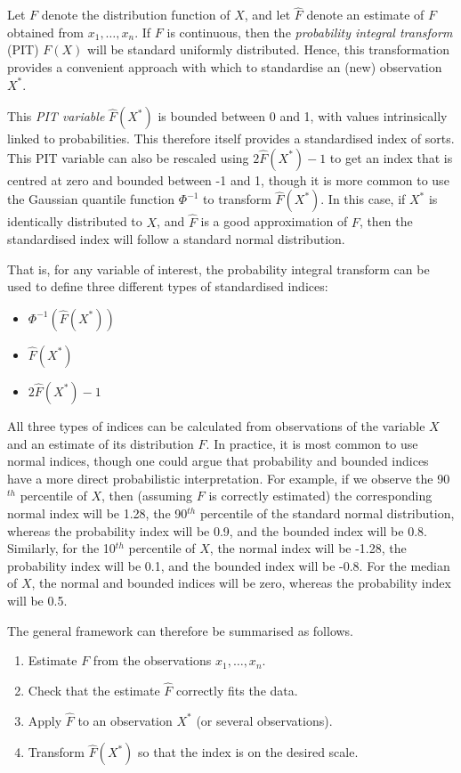 \documentclass[article,shortnames,nojss]{jss}\usepackage[]{graphicx}\usepackage[]{xcolor}
\begin{document}
Let $F$ denote the distribution function of $X$, and let $\hat{F}$ denote an estimate of $F$ obtained from $x_{1}, \dots, x_{n}$. If $F$ is continuous, then the \emph{probability integral transform} (PIT) $F(X)$ will be standard uniformly distributed. Hence, this transformation provides a convenient approach with which to standardise an (new) observation $X^{*}$.

This \emph{PIT variable} $\hat{F}(X^{*})$ is bounded between 0 and 1, with values intrinsically linked to probabilities. This therefore itself provides a standardised index of sorts. This PIT variable can also be rescaled using $2\hat{F}(X^{*}) - 1$ to get an index that is centred at zero and bounded between -1 and 1, though it is more common to use the Gaussian quantile function $\Phi^{-1}$ to transform $\hat{F}(X^{*})$. In this case, if $X^{*}$ is identically distributed to $X$, and $\hat{F}$ is a good approximation of $F$, then the standardised index will follow a standard normal distribution.

That is, for any variable of interest, the probability integral transform can be used to define three different types of standardised indices:
\begin{itemize}
  \item {} $\Phi^{-1}(\hat{F}(X^{*}))$
  \item {} $\hat{F}(X^{*})$
  \item {} $2\hat{F}(X^{*}) - 1$
\end{itemize}

All three types of indices can be calculated from observations of the variable $X$ and an estimate of its distribution $F$. In practice, it is most common to use normal indices, though one could argue that probability and bounded indices have a more direct probabilistic interpretation. For example, if we observe the 90$^{th}$ percentile of $X$, then (assuming $F$ is correctly estimated) the corresponding normal index will be 1.28, the 90$^{th}$ percentile of the standard normal distribution, whereas the probability index will be 0.9, and the bounded index will be 0.8. Similarly, for the 10$^{th}$ percentile of $X$, the normal index will be -1.28, the probability index will be 0.1, and the bounded index will be -0.8. For the median of $X$, the normal and bounded indices will be zero, whereas the probability index will be 0.5.

The general framework can therefore be summarised as follows.
\begin{enumerate}
  \item Estimate $F$ from the observations $x_{1}, \dots, x_{n}$.
  \item Check that the estimate $\hat{F}$ correctly fits the data.
  \item Apply $\hat{F}$ to an observation $X^{*}$ (or several observations).
  \item Transform $\hat{F}(X^{*})$ so that the index is on the desired scale.
\end{enumerate}
\end{document}
